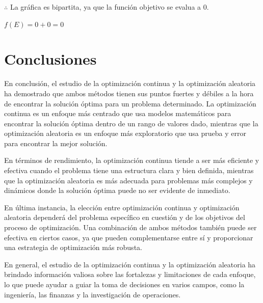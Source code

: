 \documentclass{article}
\begin{document}
$\therefore$ La gráfica es bipartita, ya que la función objetivo se evalua a 0.

$f(E) = 0 + 0 = 0$

\newpage
\section*{Conclusiones}

En conclusión, el estudio de la optimización continua y la optimización aleatoria ha demostrado que ambos métodos tienen sus puntos fuertes y débiles a la hora de encontrar la solución óptima para un problema determinado. La optimización continua es un enfoque más centrado que usa modelos matemáticos para encontrar la solución óptima dentro de un rango de valores dado, mientras que la optimización aleatoria es un enfoque más exploratorio que usa prueba y error para encontrar la mejor solución.

En términos de rendimiento, la optimización continua tiende a ser más eficiente y efectiva cuando el problema tiene una estructura clara y bien definida, mientras que la optimización aleatoria es más adecuada para problemas más complejos y dinámicos donde la solución óptima puede no ser evidente de inmediato.

En última instancia, la elección entre optimización continua y optimización aleatoria dependerá del problema específico en cuestión y de los objetivos del proceso de optimización. Una combinación de ambos métodos también puede ser efectiva en ciertos casos, ya que pueden complementarse entre sí y proporcionar una estrategia de optimización más robusta.

En general, el estudio de la optimización continua y la optimización aleatoria ha brindado información valiosa sobre las fortalezas y limitaciones de cada enfoque, lo que puede ayudar a guiar la toma de decisiones en varios campos, como la ingeniería, las finanzas y la investigación de operaciones.

\newpage
\end{document}
